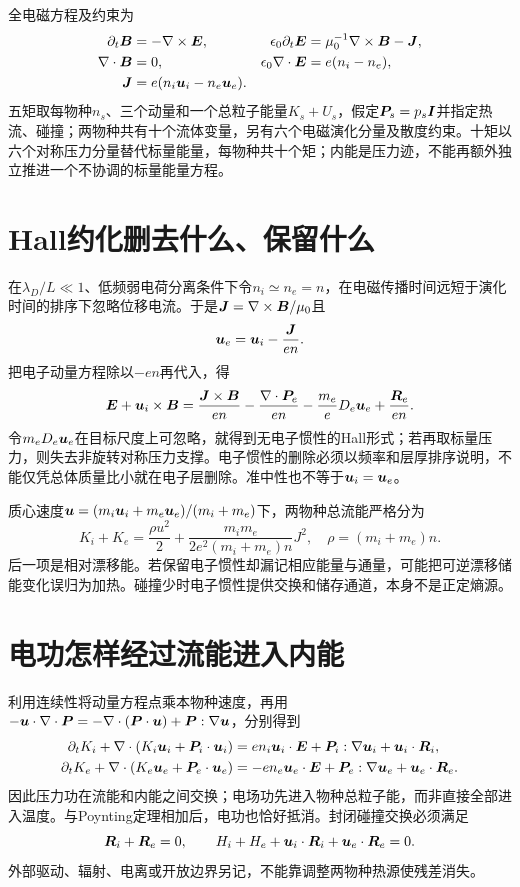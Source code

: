 全电磁方程及约束为
\begin{align}
\partial_t\bm{B}&=-\nabla\times\bm{E},&\epsilon_0\partial_t\bm{E}&=\mu_0^{-1}\nabla\times\bm{B}-\bm{J},\\
\nabla\cdot\bm{B}&=0,&\epsilon_0\nabla\cdot\bm{E}&=e(n_i-n_e),\\
\bm{J}&=e(n_i\bm{u}_i-n_e\bm{u}_e).
\end{align}
五矩取每物种$n_s$、三个动量和一个总粒子能量$K_s+U_s$，假定$\bm{P}_s=p_s\bm{I}$并指定热流、碰撞；两物种共有十个流体变量，另有六个电磁演化分量及散度约束。十矩以六个对称压力分量替代标量能量，每物种共十个矩；内能是压力迹，不能再额外独立推进一个不协调的标量能量方程。\citep{Wang2015,TenBarge2019MMS}

\section{Hall约化删去什么、保留什么}
在$\lambda_D/L\ll1$、低频弱电荷分离条件下令$n_i\simeq n_e=n$，在电磁传播时间远短于演化时间的排序下忽略位移电流。于是$\bm{J}=\nabla\times\bm{B}/\mu_0$且
\begin{equation}\bm{u}_e=\bm{u}_i-\frac{\bm{J}}{en}.\end{equation}
把电子动量方程除以$-en$再代入，得
\begin{equation}
\bm{E}+\bm{u}_i\times\bm{B}=
\frac{\bm{J}\times\bm{B}}{en}-\frac{\nabla\cdot\bm{P}_e}{en}
-\frac{m_e}{e}D_e\bm{u}_e+\frac{\bm{R}_e}{en}.
\label{eq:ohm}
\end{equation}
令$m_eD_e\bm{u}_e$在目标尺度上可忽略，就得到无电子惯性的Hall形式；若再取标量压力，则失去非旋转对称压力支撑。电子惯性的删除必须以频率和层厚排序说明，不能仅凭总体质量比小就在电子层删除。准中性也不等于$\bm{u}_i=\bm{u}_e$。

质心速度$\bm{u}=(m_i\bm{u}_i+m_e\bm{u}_e)/(m_i+m_e)$下，两物种总流能严格分为
\begin{equation}
K_i+K_e=\frac{\rho u^2}{2}+\frac{m_im_e}{2e^2(m_i+m_e)n}J^2,
\quad\rho=(m_i+m_e)n.
\end{equation}
后一项是相对漂移能。若保留电子惯性却漏记相应能量与通量，可能把可逆漂移储能变化误归为加热。碰撞少时电子惯性提供交换和储存通道，本身不是正定熵源。

\section{电功怎样经过流能进入内能}
利用连续性将动量方程点乘本物种速度，再用
$-\bm{u}\cdot\nabla\cdot\bm{P}=-\nabla\cdot(\bm{P}\cdot\bm{u})+\bm{P}:\nabla\bm{u}$，分别得到
\begin{align}
\partial_tK_i+\nabla\cdot(K_i\bm{u}_i+\bm{P}_i\cdot\bm{u}_i)
 &=en_i\bm{u}_i\cdot\bm{E}+\bm{P}_i:\nabla\bm{u}_i+\bm{u}_i\cdot\bm{R}_i,\\
\partial_tK_e+\nabla\cdot(K_e\bm{u}_e+\bm{P}_e\cdot\bm{u}_e)
 &=-en_e\bm{u}_e\cdot\bm{E}+\bm{P}_e:\nabla\bm{u}_e+\bm{u}_e\cdot\bm{R}_e.
\end{align}
因此压力功在流能和内能之间交换；电场功先进入物种总粒子能，而非直接全部进入温度。与Poynting定理相加后，电功也恰好抵消。封闭碰撞交换必须满足
\begin{equation}
\bm{R}_i+\bm{R}_e=0,\qquad
H_i+H_e+\bm{u}_i\cdot\bm{R}_i+\bm{u}_e\cdot\bm{R}_e=0.
\end{equation}
外部驱动、辐射、电离或开放边界另记，不能靠调整两物种热源使残差消失。

